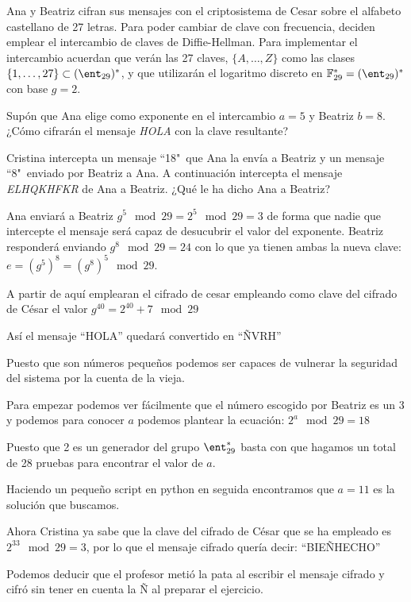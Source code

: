 \begin{problem}[5] Ana y Beatriz cifran sus mensajes con el criptosistema de Cesar
sobre el alfabeto castellano de 27 letras. Para poder cambiar de
clave con frecuencia, deciden emplear el intercambio de claves de
Diffie-Hellman. Para implementar el intercambio acuerdan que verán
las 27 claves, $\{A,\dots,Z\}$ como las clases
$\{1,\dots,27\}\subset(\ent_{29})^*$, y que utilizarán el logaritmo
discreto en $\mathbb{F}_{29}^*=(\ent_{29})^*$ con base $g=2$.

\ppart Supón que Ana elige como exponente en el intercambio $a=5$ y
Beatriz $b=8$. ¿Cómo cifrarán el mensaje {\it HOLA} con la clave
resultante?



\ppart Cristina intercepta un mensaje ``18"\ que Ana la envía a Beatriz
y un mensaje ``8"\ enviado por Beatriz a Ana. A continuación
intercepta el mensaje {\it ELHQKHFKR} de Ana a Beatriz. ¿Qué le ha
dicho Ana a Beatriz?

\solution

\spart

Ana enviará a Beatriz $g^5 \mod 29 = 2^5 \mod 29 = 3$ de forma que nadie que intercepte el mensaje será capaz de desucubrir el valor del exponente. Beatriz responderá enviando $g^{8} \mod 29 = 24$ con lo que ya tienen ambas la nueva clave: $e=(g^5)^8=(g^8)^5 \mod 29$.

A partir de aquí emplearan el cifrado de cesar empleando como clave del cifrado de César el valor $g^{40}=2^{40}+7 \mod 29$

Así el mensaje ``HOLA'' quedará convertido en ``ÑVRH''

\spart

Puesto que son números pequeños podemos ser capaces de vulnerar la seguridad del sistema por la cuenta de la vieja.

Para empezar podemos ver fácilmente que el número escogido por Beatriz es un $3$ y podemos para conocer $a$ podemos plantear la ecuación: $2^a \mod 29=18$

Puesto que 2 es un generador del grupo $\ent_{29}^*$ basta con que hagamos un total de 28 pruebas para encontrar el valor de $a$. 

Haciendo un pequeño script en python en seguida encontramos que $a=11$ es la solución que buscamos. 

Ahora Cristina ya sabe que la clave del cifrado de César que se ha empleado es $2^{33} \mod 29 =3$, por lo que el mensaje cifrado quería decir: ``BIEÑHECHO''

Podemos deducir que el profesor metió la pata al escribir el mensaje cifrado y cifró sin tener en cuenta la Ñ al preparar el ejercicio.
\end{problem}

